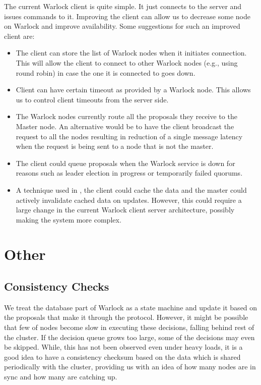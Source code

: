 The current Warlock client is quite simple. It just connects to the server and
issues commands to it. Improving the client can allow us to decrease some
node on Warlock and improve availability. Some suggestions for such an improved
client are:

\begin{itemize}
  \item The client can store the list of Warlock nodes when it initiates
    connection. This will allow the client to connect to other Warlock nodes
    (e.g., using round robin) in case the one it is connected to goes down.
  \item Client can have certain timeout as provided by a Warlock node. This
    allows us to control client timeouts from the server side.
  \item The Warlock nodes currently route all the proposals they receive to the
    Master node. An alternative would be to have the client broadcast the
    request to all the nodes resulting in reduction of a single message latency
    when the request is being sent to a node that is not the master.
  \item The client could queue proposals when the Warlock service is down for
    reasons such as leader election in progress or temporarily failed quorums.
  \item A technique used in \citet{Burrows06}, the client could cache the data
    and the master could actively invalidate cached data on updates. However,
    this could require a large change in the current Warlock client server
    architecture, possibly making the system more complex.
\end{itemize}

\section{Other}

\subsection{Consistency Checks}

We treat the database part of Warlock as a state machine and update it based
on the proposals that make it through the protocol. However, it
might be possible that few of nodes become slow in executing
these decisions, falling behind
rest of the cluster. If the decision queue grows too large, some of the
decisions may even be skipped. While, this has not been observed even under
heavy loads, it is a good idea to have a consistency checksum based on the data
which is shared periodically with the cluster, providing us with an idea of
how many nodes are in sync and how many are catching up.

